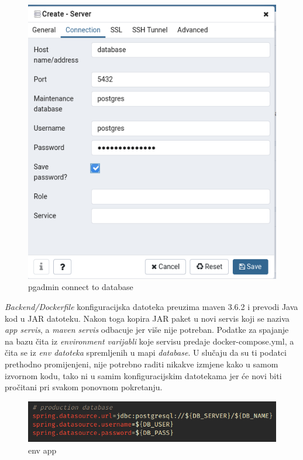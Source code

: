 		\begin{figure}[H]
					\includegraphics[scale=0.6]{figures/4-pgadmin.PNG}
					\centering
					\caption{pgadmin connect to database}
					\label{fig:sekv-uc13}
				\end{figure} 
												
				
		
		 \textit{Backend/Dockerfile} konfiguracijska datoteka preuzima maven 3.6.2 i prevodi Java kod u JAR datoteku. Nakon toga kopira JAR paket u novi servis koji se naziva  \textit{app servis}, a  \textit{maven servis} odbacuje jer više nije potreban. Podatke za spajanje na bazu čita iz  \textit{environment varijabli} koje servisu predaje docker-compose.yml, a čita se iz  \textit{env datoteka} spremljenih u mapi  \textit{database}. U slučaju da su ti podatci prethodno promijenjeni, nije potrebno raditi nikakve izmjene kako u samom izvornom kodu, tako ni u  samim konfiguracijskim datotekama jer će novi biti pročitani pri svakom ponovnom pokretanju.		
		
		\begin{figure}[H]
					\includegraphics[scale=0.8]{figures/5-env.PNG}
					\centering
					\caption{env app}
					\label{fig:env app}
				\end{figure} 
				
